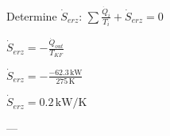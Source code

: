Determine \( \dot{S}_{erz} \):  
\( \sum \frac{\dot{Q}_i}{T_i} + \dot{S}_{erz} = 0 \)  

\( \dot{S}_{erz} = - \frac{\dot{Q}_{out}}{T_{KF}} \)  

\( \dot{S}_{erz} = - \frac{-62.3 \, \text{kW}}{275 \, \text{K}} \)  

\( \dot{S}_{erz} = 0.2 \, \text{kW/K} \)  

---